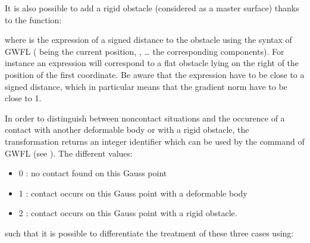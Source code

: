 \documentclass[a4paper,11pt,english]{sphinxmanual}
\begin{document}
It is also possible to add a rigid obstacle (considered as a master surface) thanks to the function:

\begin{sphinxVerbatim}[commandchars=\\\{\}]
 
             
               
\end{sphinxVerbatim}

where  is the expression of a signed distance to the obstacle using the syntax of GWFL ( being the current position, ,  … the corresponding components). For instance an expression  will correspond to a flat obstacle lying on the right of the position  of the first coordinate. Be aware that the expression have to be close to a signed distance, which in particular means that the gradient norm have to be close to 1.

In order to distinguish between non\sphinxhyphen{}contact situations and the occurence of a contact with another deformable body or with a rigid obstacle, the transformation returns an integer identifier which can be used by the  command of GWFL (see {\hyperref[\detokenize{userdoc/gasm_high:ud-gasm-high-transf}]{}}). The different values:
\begin{itemize}
\item {} 
0 : no contact found on this Gauss point

\item {} 
1 : contact occurs on this Gauss point with a deformable body

\item {} 
2 : contact occurs on this Gauss point with a rigid obstacle.

\end{itemize}

such that it is possible to differentiate the treatment of these three cases using:
\end{document}
